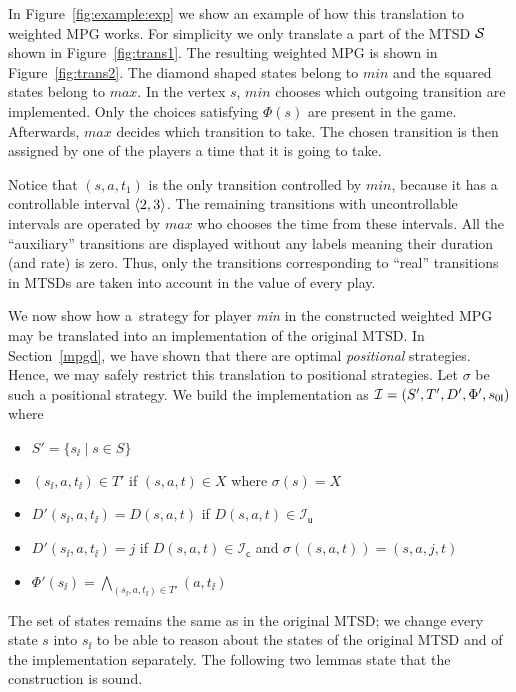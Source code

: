 \begin{example}
In Figure~\ref{fig:example:exp} we show an example of how this
translation to weighted MPG works. For simplicity we only translate a part of
the MTSD $\mathcal S$ shown in Figure~\ref{fig:trans1}. 
The resulting weighted MPG is shown in Figure~\ref{fig:trans2}. The
diamond shaped states belong to $min$ and the squared states belong to $max$.
In the vertex $s$, $min$ chooses which outgoing transition are implemented.
Only the choices satisfying $\Phi(s)$ are present in the game. Afterwards, $max$
decides which transition to take. The chosen transition is then assigned 
by one of the players a time that it is going to take.

Notice that $(s,a,t_1)$ is the only
transition controlled by $min$, because it has a controllable interval
$\langle2,3\rangle$. The remaining transitions with uncontrollable intervals are operated
by $max$ who chooses the time from these intervals. All the ``auxiliary''
transitions are displayed without any labels meaning their duration (and rate)
is zero. Thus, only the transitions corresponding to ``real'' transitions in
MTSDs are taken into account in the value of every play.
\end{example}




We now show how a~strategy for player \emph{min} in the constructed weighted MPG may
be translated into an implementation of the original MTSD. In Section~\ref{mpgd}, we have shown that there are optimal \emph{positional} strategies. Hence, we may safely restrict this translation to positional strategies.
Let $\sigma$ be such a positional
strategy. We build the implementation as $\mathcal I=(S',T',D',\Phi',s_{0\mathsf I})$ where
\begin{itemize}
\item $S' = \{  s_\ii \mid s \in S \}$
\item $(s_\ii,a,t_\ii) \in T'$ if $(s,a,t) \in X$ where $\sigma(s) = X$
\item $D'(s_\ii,a,t_\ii) = D(s,a,t)$ if $D(s,a,t) \in \mathcal I_\mathsf u$
\item $D'(s_\ii,a,t_\ii) = j$ if $D(s,a,t) \in \mathcal I_\mathsf c$ and
	$\sigma((s,a,t)) = (s,a,j,t)$
\item $\Phi'(s_\ii) = \bigwedge_{(s_\ii,a,t_\ii)\in T'} (a,t_\ii)$
\end{itemize}
The set of states remains the same as in the original MTSD; we change every
state $s$ into $s_\ii$ to be able to reason about the states of the original
MTSD and of the implementation separately.
%
The following two lemmas state that the construction is sound.


